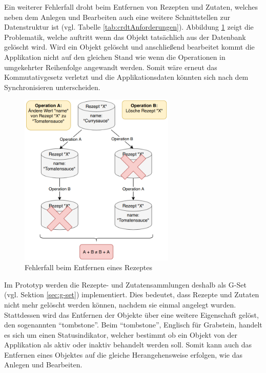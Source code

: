 \documentclass[a4paper, 12pt]{scrreprt}
\begin{document}
Ein weiterer Fehlerfall droht beim Entfernen von Rezepten und Zutaten, welches neben dem Anlegen und Bearbeiten auch eine weitere Schnittstellen zur Datenstruktur ist (vgl. Tabelle \ref{tab:crdtAnforderungen}). Abbildung \ref{fig:rezeptLöschenSchlecht} zeigt die Problematik, welche auftritt wenn das Objekt tatsächlich aus der Datenbank gelöscht wird. Wird ein Objekt gelöscht und anschließend bearbeitet kommt die Applikation nicht auf den gleichen Stand wie wenn die Operationen in umgekehrter Reihenfolge angewandt werden. Somit wäre erneut das Kommutativgesetz verletzt und die Applikationsdaten könnten sich nach dem Synchronisieren unterscheiden. 

\begin{figure}[H]
	\centering
	\includegraphics[width=0.66\textwidth]{deleteRecipeBad.png}
	\caption{Fehlerfall beim Entfernen eines Rezeptes}
	\label{fig:rezeptLöschenSchlecht}
\end{figure}

Im Prototyp werden die Rezepte- und Zutatensammlungen deshalb als G-Set (vgl. Sektion \ref{sec:g-set}) implementiert. Dies bedeutet, dass Rezepte und Zutaten nicht mehr gelöscht werden können, nachdem sie einmal angelegt wurden. Stattdessen wird das Entfernen der Objekte über eine weitere Eigenschaft gelöst, den sogenannten \enquote{tombstone}. Beim \enquote{tombstone}, Englisch für Grabstein, handelt es sich um einen Statusindikator, welcher bestimmt ob ein Objekt von der Applikation als aktiv oder inaktiv behandelt werden soll. Somit kann auch das Entfernen eines Objektes auf die gleiche Herangehensweise erfolgen, wie das Anlegen und Bearbeiten.
\end{document}
